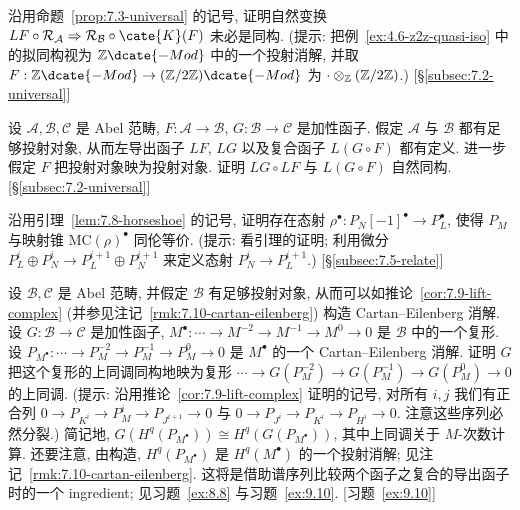 \begin{prob}\label{ex:7.3}
沿用命题~\ref{prop:7.3-universal} 的记号, 证明自然变换 $L F\circ\mathcal{R}_{\mathcal{A}}\Rightarrow \mathcal{R}_{\mathcal{B}}\circ\cate{K}(F)$ 未必是同构. (提示: 把例~\ref{ex:4.6-z2z-quasi-iso} 中的拟同构视为 $\ZZ\dcate{-Mod}$ 中的一个投射消解, 并取 $F:\ZZ\dcate{-Mod}\to(\ZZ/2\ZZ)\dcate{-Mod}$ 为 $\cdot\otimes_{\mathbb{Z}}(\mathbb{Z}/2\mathbb{Z})$.) [\S\ref{subsec:7.2-universal}]
\end{prob}

\begin{prob}\label{ex:7.4}
设 $\mathcal{A},\mathcal{B},\mathcal{C}$ 是 Abel 范畴, $F:\mathcal{A}\to\mathcal{B}$, $G:\mathcal{B}\to\mathcal{C}$ 是加性函子. 假定 $\mathcal{A}$ 与 $\mathcal{B}$ 都有足够投射对象, 从而左导出函子 $L F$, $L G$ 以及复合函子 $L(G\circ F)$ 都有定义. 进一步假定 $F$ 把投射对象映为投射对象. 证明 $L G\circ L F$ 与 $L(G\circ F)$ 自然同构. [\S\ref{subsec:7.2-universal}]
\end{prob}

\begin{prob}\label{ex:7.5}
沿用引理~\ref{lem:7.8-horseshoe} 的记号, 证明存在态射 $\rho^\bullet:P_N[-1]^\bullet\to P_L^\bullet$, 使得 $P_M$ 与映射锥 $\mathrm{MC}(\rho)^\bullet$ 同伦等价. (提示: 看引理的证明; 利用微分 $P_L^i\oplus P_N^i\to P_L^{i+1}\oplus P_N^{i+1}$ 来定义态射 $P_N^i\to P_L^{i+1}$.) [\S\ref{subsec:7.5-relate}]
\end{prob}

\begin{prob}\label{ex:7.6}
设 $\mathcal{B},\mathcal{C}$ 是 Abel 范畴, 并假定 $\mathcal{B}$ 有足够投射对象, 从而可以如推论~\ref{cor:7.9-lift-complex} (并参见注记~\ref{rmk:7.10-cartan-eilenberg}) 构造 Cartan--Eilenberg 消解. 设 $G:\mathcal{B}\to\mathcal{C}$ 是加性函子, $M^\bullet:\cdots\to M^{-2}\to M^{-1}\to M^0\to 0$ 是 $\mathcal{B}$ 中的一个复形. 设 $P_{M^\bullet}:\cdots\to P_{M}^{-2}\to P_{M}^{-1}\to P_{M}^0\to 0$ 是 $M^\bullet$ 的一个 Cartan--Eilenberg 消解. 证明 $G$ 把这个复形的上同调同构地映为复形 $\cdots\to G(P_{M}^{-2})\to G(P_{M}^{-1})\to G(P_{M}^0)\to 0$ 的上同调. (提示: 沿用推论~\ref{cor:7.9-lift-complex} 证明的记号, 对所有 $i,j$ 我们有正合列 $0\to P_{K^i}\to P_{M}^i\to P_{J^{i+1}}\to 0$ 与 $0\to P_{J^i}\to P_{K^i}\to P_{H^i}\to 0$. 注意这些序列必然分裂.) 简记地, $G(H^q(P_{M^\bullet}))\cong H^q(G(P_{M^\bullet}))$, 其中上同调关于 $M$-次数计算. 还要注意, 由构造, $H^q(P_{M^\bullet})$ 是 $H^q(M^\bullet)$ 的一个投射消解; 见注记~\ref{rmk:7.10-cartan-eilenberg}. 这将是借助谱序列比较两个函子之复合的导出函子时的一个 ingredient; 见习题~\ref{ex:8.8} 与习题~\ref{ex:9.10}. [习题~\ref{ex:9.10}]
\end{prob}

